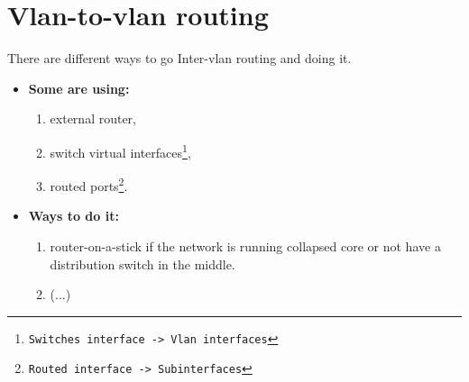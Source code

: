 \section{Vlan-to-vlan routing}


There are different ways to go  Inter-vlan routing and doing it.

\begin{itemize}
    \item \textbf{Some are using:}
    \begin{enumerate}
        \item external router,
        \item switch virtual interfaces\footnote{\texttt{Switches interface -> Vlan interfaces}},
        \item routed ports\footnote{\texttt{Routed interface -> Subinterfaces}}.
    \end{enumerate}
    \item \textbf{Ways to do it:}
    \begin{enumerate}
        \item router-on-a-stick if the network is running collapsed core or not have a distribution switch in the middle.
        \item (...)
    \end{enumerate}
\end{itemize}
